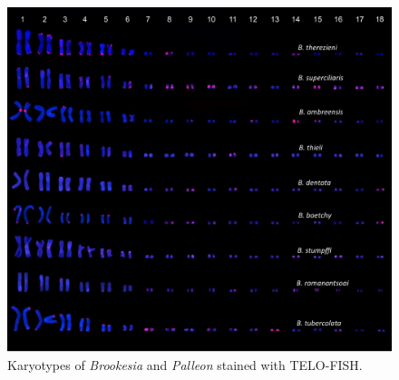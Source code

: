 \documentclass[a4paper, 12pt]{article}
\begin{document}
\newpage
\begin{figure}[h]
 \centering
  \includegraphics[width = \linewidth]{figures/marcello-s2.jpg}
  \caption{Karyotypes of \textit{Brookesia} and \textit{Palleon} stained with TELO-FISH.
}
  \label{fig-s2}
\end{figure}
\end{document}
